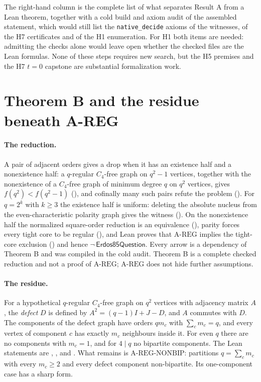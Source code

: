 \documentclass{anvil-paper}
\newcommand{\AREG}{\mathrm{A\text{-}REG}}
\newcommand{\NONBIP}{\mathrm{A\text{-}REG\text{-}NONBIP}}
\newcommand{\Qn}{\textsf{Erdos85Question}}
\theoremstyle{definition}
\begin{document}
The right-hand column is the complete list of what separates Result A from a Lean theorem, together with a cold build and axiom audit of the assembled statement, which would still list the \texttt{native\_decide} axioms of the witnesses, of the H7 certificates and of the H1 enumeration. For H1 both items are needed: admitting the checks alone would leave open whether the checked files are the Lean formulas. None of these steps requires new search, but the H5 premises and the H7 $t=0$ capstone are substantial formalization work.

\section{Theorem B and the residue beneath A-REG}\label{sec:theoremB}

\paragraph{The reduction.} A pair of adjacent orders gives a drop when it has an existence half and a nonexistence half: a $q$-regular $C_4$-free graph on $q^2-1$ vertices, together with the nonexistence of a $C_4$-free graph of minimum degree $q$ on $q^2$ vertices, gives $f(q^2)<f(q^2-1)$ (), and cofinally many such pairs refute the problem (). For $q=2^k$ with $k\ge 3$ the existence half is uniform: deleting the absolute nucleus from the even-characteristic polarity graph gives the witness (). On the nonexistence half the normalized square-order reduction is an equivalence (), parity forces every tight core to be regular (), and Lean proves that $\AREG$ implies the tight-core exclusion () and hence $\neg\,\Qn$. Every arrow is a dependency of Theorem B and was compiled in the cold audit. Theorem B is a complete checked reduction and not a proof of $\AREG$; $\AREG$ does not hide further assumptions.

\paragraph{The residue.} For a hypothetical $q$-regular $C_4$-free graph on $q^2$ vertices with adjacency matrix $A$, the \emph{defect} $D$ is defined by $A^2=(q-1)I+J-D$, and $A$ commutes with $D$. The components of the defect graph have orders $qm_c$ with $\sum_c m_c=q$, and every vertex of component $c$ has exactly $m_c$ neighbours inside it. For even $q$ there are no components with $m_c=1$, and for $4\mid q$ no bipartite components. The Lean statements are , ,  and . What remains is $\NONBIP$: partitions $q=\sum_c m_c$ with every $m_c\ge 2$ and every defect component non-bipartite. Its one-component case has a sharp form.
\end{document}
